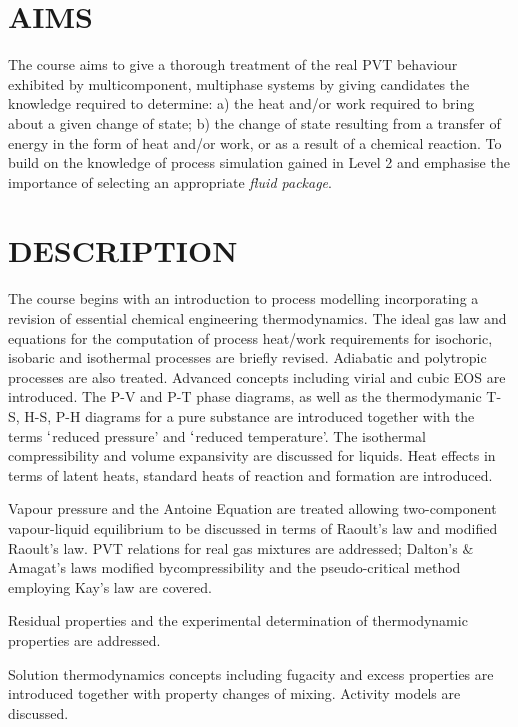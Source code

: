 \documentclass[12pts,a4paper,amsmath,amssymb,floatfix]{article}%
\begin{document}
\clearpage

\section{AIMS}
The course aims to give a thorough treatment of the real PVT behaviour exhibited by multicomponent, multiphase systems by giving candidates the knowledge required to determine: a) the heat and/or work required to bring about a given change of state; b) the change of state resulting from a transfer of energy in the form of heat and/or work, or as a result of a chemical reaction. To build on the knowledge of process simulation gained in Level 2 and emphasise the importance of selecting an appropriate {\it fluid package}.


\section{DESCRIPTION}
The course begins with an introduction to process modelling incorporating a revision of essential chemical engineering thermodynamics. The ideal gas law and equations for the computation of process heat/work requirements for isochoric, isobaric and isothermal processes are briefly revised. Adiabatic and polytropic processes are also treated. Advanced concepts including virial and cubic EOS are introduced. The P-V and P-T phase diagrams, as well as the thermodymanic T-S, H-S, P-H diagrams for a pure substance are introduced together with the terms $\lq$reduced pressure' and $\lq$reduced temperature'. The isothermal compressibility and volume expansivity are discussed for liquids. Heat effects in terms of latent heats, standard heats of reaction and formation are introduced.
\medskip

Vapour pressure and the Antoine Equation are treated allowing two-component vapour-liquid equilibrium to be discussed in terms of Raoult's law and modified Raoult's law. PVT relations for real gas mixtures are addressed; Dalton's $\&$ Amagat's laws modified bycompressibility and the pseudo-critical method employing Kay's law are covered. 
\medskip

Residual properties and the experimental determination of thermodynamic properties are addressed.
\medskip

Solution thermodynamics concepts including fugacity and excess properties are introduced together with property changes of mixing. Activity models are discussed.
\medskip
\end{document}
